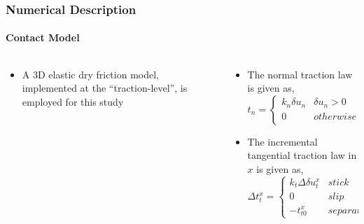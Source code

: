 \documentclass{beamertmd}
\begin{document}
\begin{frame}
  \frametitle{Numerical Description}
  \framesubtitle{Contact Model}
  \begin{columns}
    \begin{column}{0.6\linewidth}
      \vspace{-3cm}
      \begin{itemize}
      \item<1-> A 3D elastic dry friction model, implemented at the
        ``traction-level'', is employed for this study
      \end{itemize}
    \end{column}%
    \begin{column}{0.5\linewidth}
      \begin{figure}[!h]
        \centering
      \end{figure}
      \begin{itemize}
      \item<1> The normal traction law is given as,
        $$ t_n = \begin{cases} k_n\delta u_n & \delta u_n> 0 \quad (contact)\\0 &
          otherwise \quad (separation) \end{cases} $$
      \vspace{-3cm}\item<2> The incremental tangential traction law in $x$ is given as,
        $$ \Delta t_t^x = \begin{cases} k_t\Delta \delta u_t^x &
          stick\\ 0 & slip\\ -t_{t0}^x & separation \end{cases} $$
      \end{itemize}
    \end{column}
  \end{columns}
\end{frame}
\end{document}
